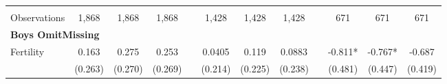 \begin{landscape}
\begin{table}[htpb!]
\begin{center}
\begin{tabular}{lcccp{2mm}cccp{2mm}ccc}
\begin{footnotesize}\end{footnotesize}&\begin{footnotesize}\end{footnotesize}&\begin{footnotesize}\end{footnotesize}&\begin{footnotesize}\end{footnotesize}&\begin{footnotesize}\end{footnotesize}&\begin{footnotesize}\end{footnotesize}&\begin{footnotesize}\end{footnotesize}&\begin{footnotesize}\end{footnotesize}&\begin{footnotesize}\end{footnotesize}&\begin{footnotesize}\end{footnotesize}&\begin{footnotesize}\end{footnotesize}&\begin{footnotesize}\end{footnotesize}\\Observations&1,868&1,868&1,868&&1,428&1,428&1,428&&671&671&671\\
\multicolumn{12}{l}{\textbf{Boys OmitMissing}}\\ 
Fertility&0.163&0.275&0.253&&0.0405&0.119&0.0883&&-0.811*&-0.767*&-0.687\\
&(0.263)&(0.270)&(0.269)&&(0.214)&(0.225)&(0.238)&&(0.481)&(0.447)&(0.419)\\

\end{tabular}
\end{center}
\end{table}
\end{landscape}
